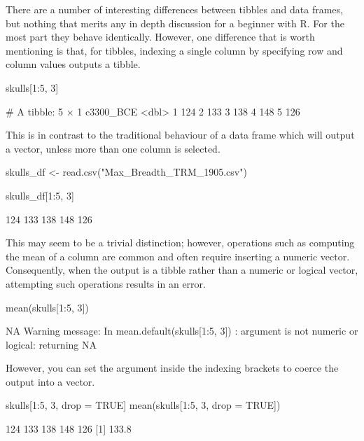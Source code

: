 \noindent
There are a number of interesting differences between tibbles and data frames, but nothing that merits any in depth discussion for a beginner with R. For the most part they behave identically. However, one difference that is worth mentioning is that, for tibbles, indexing a single column by specifying row and column values outputs a tibble.

\begin{inR}
skulls[1:5, 3]
\end{inR}

\begin{outR}
# A tibble: 5 × 1
  c3300_BCE
      <dbl>
1       124
2       133
3       138
4       148
5       126
\end{outR}

\noindent This is in contrast to the traditional behaviour of a data frame which will output a vector, unless more than one column is selected.

\begin{inR}
skulls_df <- read.csv("Max_Breadth_TRM_1905.csv")

skulls_df[1:5, 3]
\end{inR}

\begin{outR}
[1] 124 133 138 148 126
\end{outR}

This may seem to be a trivial distinction; however, operations such as computing the mean of a column are common and often require inserting a numeric vector. Consequently, when the output is a tibble rather than a numeric or logical vector, attempting such operations results in an error.

\begin{inR}
mean(skulls[1:5, 3])
\end{inR}

\begin{outR}
[1] NA
Warning message:
In mean.default(skulls[1:5, 3]) :
  argument is not numeric or logical: returning NA
\end{outR}

\noindent However, you can set the argument  inside the indexing brackets to coerce the output into a vector.

\begin{inR}
skulls[1:5, 3, drop = TRUE]
mean(skulls[1:5, 3, drop = TRUE])
\end{inR}

\begin{outR}
[1] 124 133 138 148 126
[1] 133.8
\end{outR}

